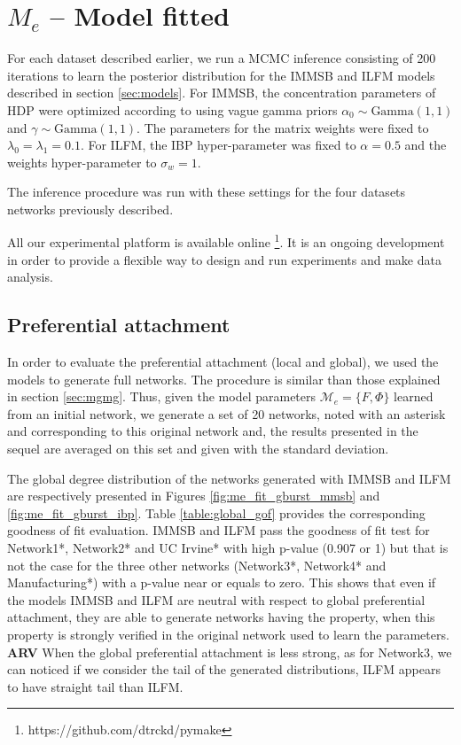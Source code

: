 \documentclass[a4paper, 12pt]{article}
\begin{document}
\section{$M_e$ -- Model fitted}

For each dataset described earlier, we run a MCMC inference consisting of 200 iterations to learn the posterior distribution for the IMMSB and ILFM  models described in section \ref{sec:models}. For IMMSB, the concentration parameters of HDP were optimized according to  \cite{HDP} using vague gamma priors $\alpha_0 \sim \text{Gamma}(1,1)$ and $\gamma \sim \text{Gamma}(1,1)$. The parameters for the matrix weights were fixed to $\lambda_0=\lambda_1=0.1$. For ILFM, the IBP hyper-parameter was fixed to $\alpha=0.5$ and the weights hyper-parameter to $\sigma_w = 1$. 

The inference procedure was run with these settings for the four datasets networks previously described.

All our experimental platform is available online \footnote{https://github.com/dtrckd/pymake}. It is an ongoing development in order to provide a flexible way to design and run experiments and make data analysis.

\subsection{Preferential attachment}

In order to evaluate the preferential attachment (local and global), we used the models to generate full networks. The procedure  is similar than those explained in section \ref{sec:mgmg}. Thus, given the model parameters $\mathcal{M}_e = \{F ,\Phi\}$ learned from an initial network, we generate a set of 20 networks, noted with an asterisk and corresponding to this original network  and, the results presented in the sequel are averaged on this set and given with the standard deviation. 

The global degree distribution of the  networks generated with  IMMSB and ILFM are respectively presented in Figures \ref{fig:me_fit_gburst_mmsb} and \ref{fig:me_fit_gburst_ibp}. Table \ref{table:global_gof} provides  the corresponding goodness of fit evaluation.
IMMSB and ILFM pass the goodness of fit test for Network1*, Network2* and UC Irvine* with high p-value (0.907 or 1) but that is not the case  for the three other networks (Network3*, Network4* and Manufacturing*) with a p-value near or equals to zero. This shows that even if the models IMMSB and ILFM  are neutral with respect to global preferential attachment, they are able to generate  networks having the property,  when this property is strongly verified in the original network used to learn the parameters.
\textbf{ARV} When the global preferential attachment is less strong, as for Network3, we can noticed if we consider the tail of the generated distributions, ILFM appears to have straight tail than ILFM.
\end{document}
